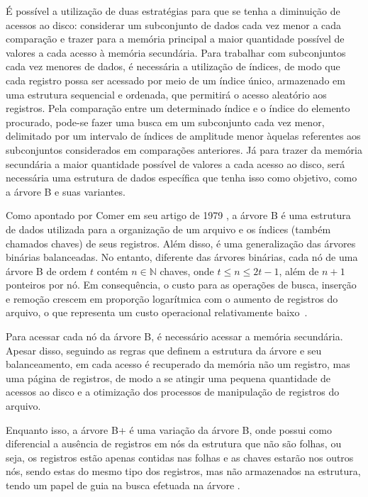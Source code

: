 \documentclass[12pt]{article}
\begin{document}
É possível a utilização de duas estratégias para que se tenha a diminuição de
acessos ao disco: considerar um subconjunto de dados cada vez menor a cada
comparação e trazer para a memória principal a maior quantidade possível de
valores a cada acesso à memória secundária. Para trabalhar com subconjuntos cada
vez menores de dados, é necessária a utilização de índices, de modo que cada
registro possa ser acessado por meio de um índice único, armazenado em uma
estrutura sequencial e ordenada, que permitirá o acesso aleatório aos registros.
Pela comparação entre um determinado índice e o índice do elemento procurado,
pode-se fazer uma busca em um subconjunto cada vez menor, delimitado por um
intervalo de índices de amplitude menor àquelas referentes aos subconjuntos
considerados em comparações anteriores. Já para trazer da memória secundária a
maior quantidade possível de valores a cada acesso ao disco, será necessária uma
estrutura de dados específica que tenha isso como objetivo, como a árvore B e
suas variantes.

Como apontado por Comer em seu artigo de 1979 \cite{cd:79}, a árvore B é uma
estrutura de dados utilizada para a organização de um arquivo e os índices
(também chamados chaves) de seus registros. Além disso, é uma generalização das
árvores binárias balanceadas. No entanto, diferente das árvores binárias, cada
nó de uma árvore B de ordem $t$ contém $n \in \mathbb{N}$ chaves, onde $t \le n
\le 2t-1$, além de $n+1$ ponteiros por nó. Em consequência, o custo para
as operações de busca, inserção e remoção crescem em proporção logarítmica com o
aumento de registros do arquivo, o que representa um custo operacional
relativamente baixo~\cite{cd:79}.

Para acessar cada nó da árvore B, é necessário acessar a memória secundária.
Apesar disso, seguindo as regras que definem a estrutura da árvore e seu
balanceamento, em cada acesso é recuperado da memória não um registro, mas uma
página de registros, de modo a se atingir uma pequena quantidade de acessos ao
disco e a otimização dos processos de manipulação de registros do arquivo.

Enquanto isso, a árvore B+ é uma variação da árvore B, onde possui como
diferencial a ausência de registros em nós da estrutura que não são folhas, ou
seja, os registros estão apenas contidas nas folhas e as chaves estarão nos
outros nós, sendo estas do mesmo tipo dos registros, mas não  armazenados na
estrutura, tendo um papel de guia na busca efetuada na árvore \cite{kpm:10}.
\end{document}
